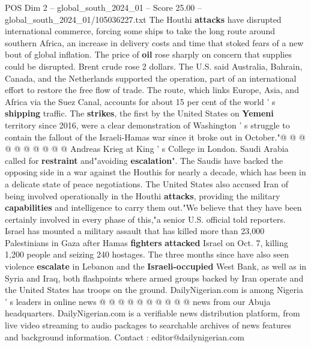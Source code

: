 \begin{textsample}{POS Dim 2 – global\_south\_2024\_01 – Score 25.00 – global\_south\_2024\_01/105036227.txt}
The Houthi \textbf{attacks} have disrupted international commerce, forcing some ships to take the long route around southern Africa, an increase in delivery costs and time that stoked fears of a new bout of global inflation.
The price of \textbf{oil} rose sharply on concern that supplies could be disrupted.
Brent crude rose 2 dollars.
The U.S. said Australia, Bahrain, Canada, and the Netherlands supported the operation, part of an international effort to restore the free flow of trade.
The route, which links Europe, Asia, and Africa via the Suez Canal, accounts for about 15 per cent of the world ' s \textbf{shipping} traffic.
The \textbf{strikes}, the first by the United States on \textbf{Yemeni} territory since 2016, were a clear demonstration of Washington ' s struggle to contain the fallout of the Israeli-Hamas war since it broke out in October."@ @ @ @ @ @ @ @ @ @ Andreas Krieg at King ' s College in London.
Saudi Arabia called for \textbf{restraint} and"avoiding \textbf{escalation}".
The Saudis have backed the opposing side in a war against the Houthis for nearly a decade, which has been in a delicate state of peace negotiations.
The United States also accused Iran of being involved operationally in the Houthi \textbf{attacks}, providing the military \textbf{capabilities} and intelligence to carry them out."We believe that they have been certainly involved in every phase of this,"a senior U.S. official told reporters.
Israel has mounted a military assault that has killed more than 23,000 Palestinians in Gaza after Hamas \textbf{fighters} \textbf{attacked} Israel on Oct. 7, killing 1,200 people and seizing 240 hostages.
The three months since have also seen violence \textbf{escalate} in Lebanon and the \textbf{Israeli-occupied} West Bank, as well as in Syria and Iraq, both flashpoints where armed groups backed by Iran operate and the United States has troops on the ground.
DailyNigerian.com is among Nigeria ' s leaders in online news @ @ @ @ @ @ @ @ @ @ news from our Abuja headquarters.
DailyNigerian.com is a verifiable news distribution platform, from live video streaming to audio packages to searchable archives of news features and background information.
Contact : editor@dailynigerian.com

\end{textsample}
